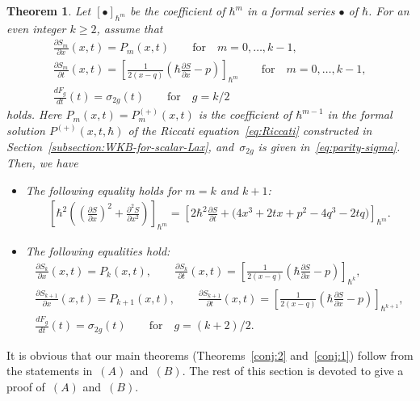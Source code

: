 \documentclass[11pt]{article}
\newtheorem{thm}{Theorem}[section]
\theoremstyle{definition}
\numberwithin{equation}{section}
\def\p{\partial}
\begin{document}
\begin{thm} \label{thm:induction-scheme}
Let $[\bullet]_{\hbar^{m}}$ be the coefficient of
$\hbar^{m}$ in a formal series $\bullet$ of $\hbar$.
For an even integer $k \ge 2$, assume that
\begin{gather}
\frac{\p S_{m}}{\p x}(x,t) = P_{m}(x,t)\qquad
\text{for} \quad m=0,\dots,k-1, \nonumber\\
\frac{\p S_{m}}{\p t}(x,t) = \left[ \frac{1}{2(x-q)}\left(
\hbar \frac{\p S}{\p x} - p \right) \right]_{\hbar^{m}} \qquad
\text{for} \quad m=0,\dots,k-1, \nonumber\\
\frac{d F_{g}}{d t}(t) = \sigma_{2g}(t)  \qquad
\text{for} \quad g = k/2
\label{eq:assume-A-1}
\end{gather}
holds. Here $P_{m}(x,t) = P^{(+)}_{m}(x,t)$
is the coefficient of $\hbar^{m-1}$ in the formal solution
$P^{(+)}(x,t,\hbar)$ of the Riccati equation~\eqref{eq:Riccati}
constructed in Section~{\rm \ref{subsection:WKB-for-scalar-Lax}},
and~$\sigma_{2g}$ is given in~\eqref{eq:parity-sigma}.
Then, we have
\begin{itemize}\itemsep=0pt
\item[$(A)$] %
The following equality holds for $m = k$ and $k+1$:
\begin{gather}
\label{eq:claim-A-1}
\left[
\hbar^{2}\left( \left(\frac{\p S}{\p x}\right)^{2} +
\frac{\p^{2} S}{\p x^{2}} \right)
\right]_{\hbar^{m}}
 =  \left[ 2\hbar^{2} \frac{\p S}{\p t} +
\big(4x^{3}+2t x + p^{2} - 4q^{3}-2tq\big) \right]_{\hbar^{m}}.
\end{gather}

\item[$(B)$]
The following equalities hold:
\begin{gather}
\label{eq:claim-A-3}
\frac{\p S_{k}}{\p x}(x,t)   =   P_{k}(x,t), \qquad
\frac{\p S_{k}}{\p t}(x,t) = \left[ \frac{1}{2(x-q)}\left(
\hbar \frac{\p S}{\p x} - p \right) \right]_{\hbar^{k}}, \\
\frac{\p S_{k+1}}{\p x}(x,t)   =   P_{k+1}(x,t), \qquad
\frac{\p S_{k+1}}{\p t}(x,t) = \left[ \frac{1}{2(x-q)}\left(
\hbar \frac{\p S}{\p x} - p \right) \right]_{\hbar^{k+1}}, \label{eq:claim-B-3}
\\
\label{eq:claim-B-4}
\frac{dF_{g}}{dt}(t)   =    \sigma_{2g}(t)
\qquad \text{for} \quad g=(k+2)/2.
\end{gather}
\end{itemize}
\end{thm}

It is obvious that our main theorems (Theorems~\ref{conj:2} and~\ref{conj:1})
follow from the statements
in~$(A)$ and~$(B)$. The rest of this section is devoted to
give a proof of~$(A)$ and~$(B)$.
\end{document}
